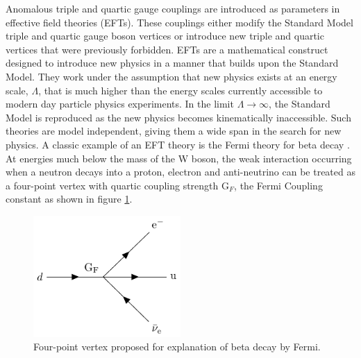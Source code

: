 Anomalous triple and quartic gauge couplings are introduced as parameters in effective field theories (EFTs).  These couplings either modify the Standard Model triple and quartic gauge boson vertices or introduce new triple and quartic vertices that were previously forbidden.  EFTs are a mathematical construct designed to introduce new physics in a manner that builds upon the Standard Model.  They work under the assumption that new physics exists at an energy scale, $\Lambda$, that is much higher than the energy scales currently accessible to modern day particle physics experiments.  In the limit $\Lambda \rightarrow \infty$, the Standard Model is reproduced as the new physics becomes kinematically inaccessible.  Such theories are model independent, giving them a wide span in the search for new physics.  A classic example of an EFT theory is the Fermi theory for beta decay \cite{Fermi:1934hr}.  At energies much below the mass of the W boson, the weak interaction occurring when a neutron decays into a proton, electron and anti-neutrino can be treated as a four-point vertex with quartic coupling strength $\text{G}_{F}$, the Fermi Coupling constant as shown in figure \ref{fig:fermitheory}.

\begin{figure}[h!]
\includegraphics[width=0.5\textwidth]{PhysicsAnalysis/Plots/FeynmanDiagrams/FermiTheory.pdf}
\caption[Four-point vertex proposed for explanation of beta decay by Fermi.]{Four-point vertex proposed for explanation of beta decay by Fermi.} 
\label{fig:fermitheory}
\end{figure}

